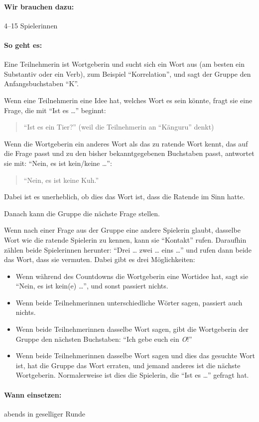 \paragraph{Wir brauchen dazu:} 4--15 Spielerinnen
\paragraph{So geht es:} Eine Teilnehmerin ist Wortgeberin und sucht sich ein Wort aus (am besten ein Substantiv oder ein Verb), zum Beispiel ``Korrelation'', und sagt der Gruppe den Anfangsbuchstaben ``K''.

Wenn eine Teilnehmerin eine Idee hat, welches Wort es sein könnte, fragt sie eine Frage, die mit ``Ist es …'' beginnt:
\begin{quote}
``Ist es ein Tier?'' (weil die Teilnehmerin an ``Känguru'' denkt)
\end{quote}

Wenn die Wortgeberin ein anderes Wort als das zu ratende Wort kennt, das auf die Frage passt und zu den bisher bekanntgegebenen Buchstaben passt, antwortet sie mit: ``Nein, es ist kein/keine …'':

\begin{quote}
``Nein, es ist keine Kuh.''
\end{quote}

Dabei ist es unerheblich, ob dies das Wort ist, dass die Ratende im Sinn hatte.

Danach kann die Gruppe die nächste Frage stellen.

Wenn nach einer Frage aus der Gruppe eine andere Spielerin glaubt, dasselbe Wort wie die ratende Spielerin zu kennen, kann sie ``Kontakt'' rufen. Daraufhin zählen beide Spielerinnen herunter: ``Drei … zwei … eins …'' und rufen dann beide das Wort, dass sie vermuten. Dabei gibt es drei Möglichkeiten:

\begin{itemize}
  \item Wenn während des Countdowns die Wortgeberin eine Wortidee hat, sagt sie ``Nein, es ist kein(e) …'', und sonst passiert nichts.
  \item Wenn beide Teilnehmerinnen unterschiedliche Wörter sagen, passiert auch nichts.
  \item Wenn beide Teilnehmerinnen dasselbe Wort sagen, gibt die Wortgeberin der Gruppe den nächsten Buchstaben: ``Ich gebe euch ein \emph{O}!''
  \item Wenn beide Teilnehmerinnen dasselbe Wort sagen und dies das gesuchte Wort ist, hat die Gruppe das Wort erraten, und jemand anderes ist die nächste Wortgeberin. Normalerweise ist dies die Spielerin, die ``Ist es …'' gefragt hat.
\end{itemize}

\paragraph{Wann einsetzen:} abends in geselliger Runde


